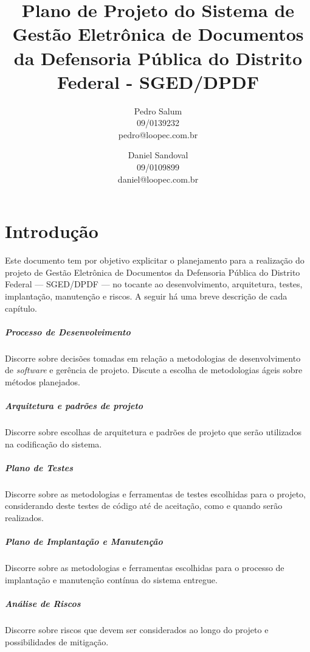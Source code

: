 \documentclass[12pt,a4paper]{report}
\title{Plano de Projeto do Sistema de Gestão Eletrônica de Documentos da Defensoria Pública do Distrito Federal - SGED/DPDF}
\author{Pedro Salum\\
	09/0139232\\
	pedro@loopec.com.br
	\and
	Daniel Sandoval\\
	09/0109899\\
	daniel@loopec.com.br}
\begin{document}
\maketitle
\tableofcontents

\chapter{Introdução}

Este documento tem por objetivo explicitar o planejamento para a realização do projeto de Gestão Eletrônica de Documentos da Defensoria Pública do Distrito Federal --- SGED/DPDF --- no tocante ao desenvolvimento, arquitetura, testes, implantação, manutenção e riscos. A seguir há uma breve descrição de cada capítulo.

\paragraph{Processo de Desenvolvimento} Discorre sobre decisões tomadas em relação a metodologias de desenvolvimento de \textit{software} e gerência de projeto. Discute a escolha de metodologias ágeis sobre métodos planejados.

\paragraph{Arquitetura e padrões de projeto} Discorre sobre escolhas de arquitetura e padrões de projeto que serão utilizados na codificação do sistema.

\paragraph{Plano de Testes} Discorre sobre as metodologias e ferramentas de testes escolhidas para o projeto, considerando deste testes de código até de aceitação, como e quando serão realizados.

\paragraph{Plano de Implantação e Manutenção} Discorre sobre as metodologias e ferramentas escolhidas para o processo de implantação e manutenção contínua do sistema entregue.

\paragraph{Análise de Riscos} Discorre sobre riscos que devem ser considerados ao longo do projeto e possibilidades de mitigação.
\end{document}
